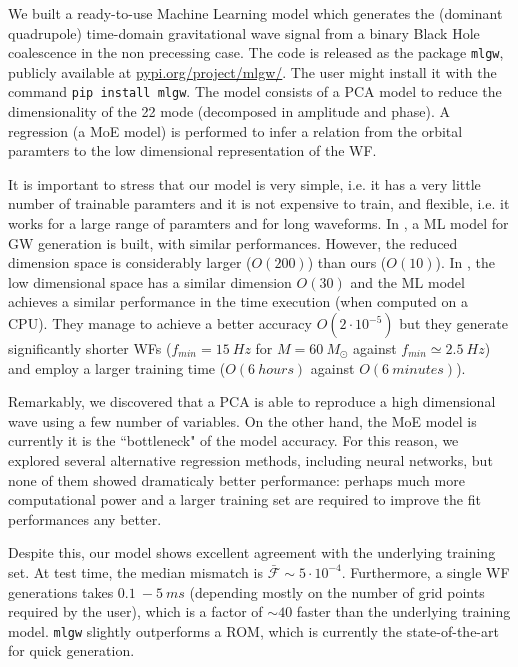 We built a ready-to-use Machine Learning model which generates the (dominant quadrupole) time-domain gravitational wave signal from a binary Black Hole coalescence in the non precessing case. The code is released as the package \texttt{mlgw}, publicly available at
\href{https://pypi.org/project/mlgw/}{pypi.org/project/mlgw/}. The user might install it with the command \texttt{pip install mlgw}.
The model consists of a PCA model to reduce the dimensionality of the 22 mode (decomposed in amplitude and phase). A regression (a MoE model) is performed to infer a relation from the orbital paramters to the low dimensional representation of the WF.
\par
It is important to stress that our model is very simple, i.e. it has a very little number of trainable paramters and it is not expensive to train, and flexible, i.e. it works for a large range of paramters and for long waveforms.
In \cite{Chua_2019}, a ML model for GW generation is built, with similar performances. However, the reduced dimension space is considerably larger ($O(200)$) than ours ($O(10)$).
In \cite{Khan:2020fso}, the low dimensional space has a similar dimension $O(30)$ and the ML model achieves a similar performance in the time execution (when computed on a CPU). They manage to achieve a better accuracy $O(2\cdot10^{-5})$ but they generate significantly shorter WFs ($f_{min} = \SI{15}{Hz}$ for $M = \SI{60}{M_{\odot}}$ against $f_{min} \simeq \SI{2.5}{Hz}$) and employ a larger training time ($O(\SI{6}{hours})$ against $O(\SI{6}{minutes})$).
\par
Remarkably, we discovered that a PCA is able to reproduce a high dimensional wave using a few number of variables.
On the other hand, the MoE model is currently it is the ``bottleneck" of the model accuracy. For this reason, we explored several alternative regression methods, including neural networks, but none of them showed dramaticaly better performance: perhaps much more computational power and a larger training set are required to improve the fit performances any better.
\par
Despite this, our model shows excellent agreement with the underlying training set. At test time, the median mismatch is $\bar{\mathcal{F}}\sim 5 \cdot 10^{-4}$.
Furthermore, a single WF generations takes $\SI{0.1}{}-\SI{5}{ms}$ (depending mostly on the number of grid points required by the user), which is a factor of $\sim 40$ faster than the underlying training model.
\texttt{mlgw} slightly outperforms a ROM, which is currently the state-of-the-art for quick generation.
